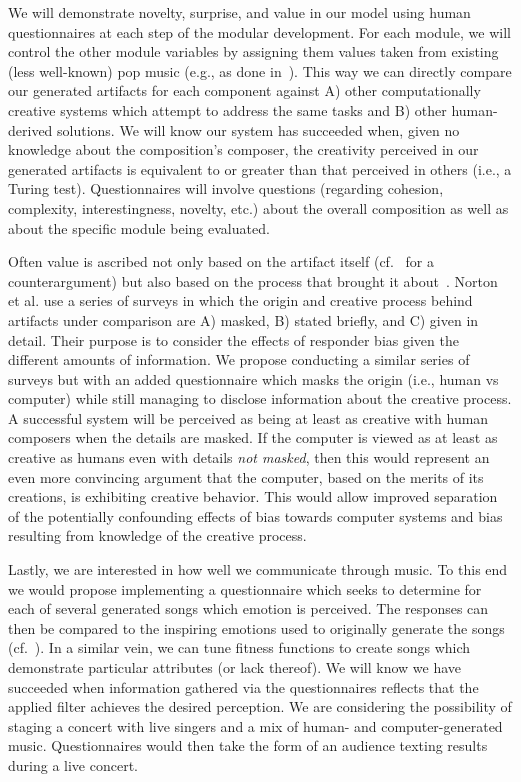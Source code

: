\documentclass[11pt,phd]{byuprop}
\begin{document}
We will demonstrate novelty, surprise, and value in our model using human questionnaires at each step of the modular development. For each module, we will control the other module variables by assigning them values taken from existing (less well-known) pop music (e.g., as done in~\cite{monteith2012automatic}). This way we can directly compare our generated artifacts for each component against A) other computationally creative systems which attempt to address the same tasks and B) other human-derived solutions. We will know our system has succeeded when, given no knowledge about the composition's composer, the creativity perceived in our generated artifacts is equivalent to or greater than that perceived in others (i.e., a Turing test). Questionnaires will involve questions (regarding cohesion, complexity, interestingness, novelty, etc.) about the overall composition as well as about the specific module being evaluated.

Often value is ascribed not only based on the artifact itself (cf.~\cite{ritchie2007some} for a counterargument) but also based on the process that brought it about~\cite{colton2012computational}. Norton et al. \cite{norton2015accounting} use a series of surveys in which the origin and creative process behind artifacts under comparison are A) masked, B) stated briefly, and C) given in detail. Their purpose is to consider the effects of responder bias given the different amounts of information. We propose conducting a similar series of surveys but with an added questionnaire which masks the origin (i.e., human vs computer) while still managing to disclose information about the creative process. A successful system will be perceived as being at least as creative with human composers when the details are masked. If the computer is viewed as at least as creative as humans even with details \emph{not masked}, then this would represent an even more convincing argument that the computer, based on the merits of its creations, is exhibiting creative behavior. This would allow improved separation of the potentially confounding effects of bias towards computer systems and bias resulting from knowledge of the creative process.

Lastly, we are interested in how well we communicate through music. To this end we would propose implementing a questionnaire which seeks to determine for each of several generated songs which emotion is perceived. The responses can then be compared to the inspiring emotions used to originally generate the songs (cf.~\cite{monteith2010automatic}). In a similar vein, we can tune fitness functions to create songs which demonstrate particular attributes (or lack thereof). We will know we have succeeded when information gathered via the questionnaires reflects that the applied filter achieves the desired perception. We are considering the possibility of staging a concert with live singers and a mix of human- and computer-generated music. Questionnaires would then take the form of an audience texting results during a live concert.
\end{document}
